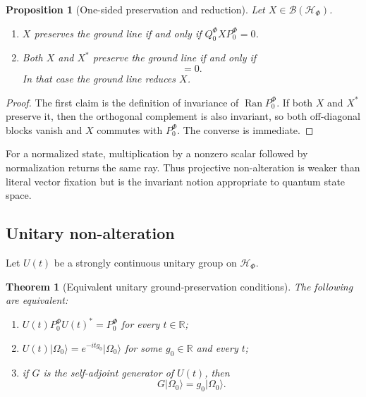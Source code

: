 \documentclass[11pt,reqno]{scrartcl}
\newcommand{\RR}{\mathbb R}
\newcommand{\scrHF}{\mathscr H_{\Phi}}
\newcommand{\PzeroF}{P_{0}^{\Phi}}
\newcommand{\QzeroF}{Q_{0}^{\Phi}}
\newcommand{\ket}[1]{\lvert #1\rangle}
\DeclareMathOperator{\Ran}{Ran}
\theoremstyle{plain}
\newtheorem{theorem}{Theorem}[section]
\newtheorem{proposition}[proposition]{Proposition}
\theoremstyle{definition}
\theoremstyle{remark}
\begin{document}
\begin{proposition}[One-sided preservation and reduction]
\label{prop:ground-preservation-reduction}
Let $X\in\mathcal B(\scrHF)$.
\begin{enumerate}[label=(\roman*)]
  \item $X$ preserves the ground line if and only if
  $\QzeroF X\PzeroF=0$.
  \item Both $X$ and $X^*$ preserve the ground line if and only if
  \begin{equation}
    [X,\PzeroF]=0.
    \label{eq:ground-reducing-commutator}
  \end{equation}
  In that case the ground line reduces $X$.
\end{enumerate}
\end{proposition}

\begin{proof}
The first claim is the definition of invariance of $\Ran\PzeroF$.  If both
$X$ and $X^*$ preserve it, then the orthogonal complement is also invariant,
so both off-diagonal blocks vanish and $X$ commutes with $\PzeroF$.  The
converse is immediate.
\end{proof}

For a normalized state, multiplication by a nonzero scalar followed by
normalization returns the same ray.  Thus projective non-alteration is weaker
than literal vector fixation but is the invariant notion appropriate to
quantum state space.

\subsection{Unitary non-alteration}

Let $U(t)$ be a strongly continuous unitary group on $\scrHF$.

\begin{theorem}[Equivalent unitary ground-preservation conditions]
\label{thm:unitary-ground-preservation}
The following are equivalent:
\begin{enumerate}[label=(\roman*)]
  \item $U(t)\PzeroF U(t)^*=\PzeroF$ for every $t\in\RR$;
  \item $U(t)\ket{\Omega_0}=e^{-itg_0}\ket{\Omega_0}$ for some
  $g_0\in\RR$ and every $t$;
  \item if $G$ is the self-adjoint generator of $U(t)$, then
  \begin{equation}
    G\ket{\Omega_0}=g_0\ket{\Omega_0}.
    \label{eq:ground-generator-eigenvector}
  \end{equation}
\end{enumerate}
\end{theorem}
\end{document}
